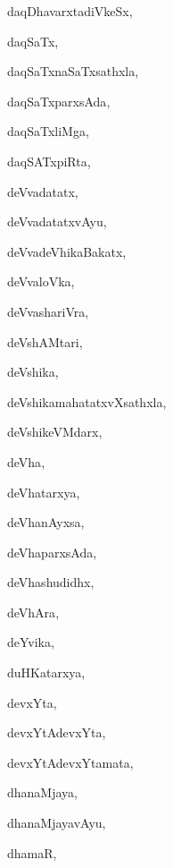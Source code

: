 \begin{multicols}{3}
{\noindent
{daqDhavarxtadiVkeSx}, \pageref{daqDhavarxtadiVkeSx}

\noindent
{daqSaTx}, \pageref{daqSaTx}

\noindent
{daqSaTxnaSaTxsathxla}, \pageref{daqSaTxnaSaTxsathxla}

\noindent
{daqSaTxparxsAda}, \pageref{daqSaTxparxsAda}

\noindent
{daqSaTxliMga}, \pageref{daqSaTxliMga}

\noindent
{daqSATxpiRta}, \pageref{daqSATxpiRta}

\noindent
{deVvadatatx}, \pageref{deVvadatatx}

\noindent
{deVvadatatxvAyu}, \pageref{deVvadatatxvAyu}

\noindent
{deVvadeVhikaBakatx}, \pageref{deVvadeVhikaBakatx}

\noindent
{deVvaloVka}, \pageref{deVvaloVka}

\noindent
{deVvashariVra}, \pageref{deVvashariVra}

\noindent
{deVshAMtari}, \pageref{deVshAMtari}

\noindent
{deVshika}, \pageref{deVshika}

\noindent
{deVshikamahatatxvXsathxla}, \pageref{deVshikamahatatxvXsathxla}

\noindent
{deVshikeVMdarx}, \pageref{deVshikeVMdarx}

\noindent
{deVha}, \pageref{deVha}

\noindent
{deVhatarxya}, \pageref{deVhatarxya}

\noindent
{deVhanAyxsa}, \pageref{deVhanAyxsa}

\noindent
{deVhaparxsAda}, \pageref{deVhaparxsAda}

\noindent
{deVhashudidhx}, \pageref{deVhashudidhx}

\noindent
{deVhAra}, \pageref{deVhAra}

\noindent
{deYvika}, \pageref{deYvika}

\noindent
{duHKatarxya}, \pageref{duHKatarxya}

\noindent
{devxYta}, \pageref{devxYta}

\noindent
{devxYtAdevxYta}, \pageref{devxYtAdevxYta}

\noindent
{devxYtAdevxYtamata}, \pageref{devxYtAdevxYtamata}

\noindent
{dhanaMjaya}, \pageref{dhanaMjaya}

\noindent
{dhanaMjayavAyu}, \pageref{dhanaMjayavAyu}

\noindent
{dhamaR}, \pageref{dhamaR}

}
\end{multicols}

